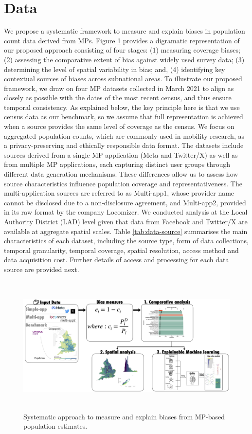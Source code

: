 \documentclass[]{rsos}%
\begin{document}
\section{Data}\label{sec-data}

We propose a systematic framework to measure and explain biases in
population count data derived from MPs. Figure
\ref{fig:debias-approach} provides a digramatic representation of our
proposed approach consisting of four stages: (1) measuring coverage
biases; (2) assessing the comparative extent of bias against widely used
survey data; (3) determining the level of spatial variability in bias;
and, (4) identifying key contextual sources of biases across subnational
areas. To illustrate our proposed framework, we draw on four MP datasets
collected in March 2021 to align as closely as possible with the dates
of the most recent census, and thus ensure temporal consistency. As
explained below, the key principle here is that we use census data as
our benchmark, so we assume that full representation is achieved when a
source provides the same level of coverage as the census. We focus on
aggregated population counts, which are commonly used in mobility
research, as a privacy-preserving and ethically responsible data format.
The datasets include sources derived from a single MP application (Meta
and Twitter/X) as well as from multiple MP applications, each capturing
distinct user groups through different data generation mechanisms. These
differences allow us to assess how source characteristics influence
population coverage and representativeness. The multi-application
sources are referred to as Multi-app1, whose provider name cannot be
disclosed due to a non-disclosure agreement, and Multi-app2, provided in
its raw format by the company Locomizer. We conducted analysis at the
Local Authority District (LAD) level given that data from Facebook and
Twitter/X are available at aggregate spatial scales. Table
\ref{tab:data-source} summarises the main characteristics of each
dataset, including the source type, form of data collections, temporal
granularity, temporal coverage, spatial resolution, access method and
data acquisition cost. Further details of access and processing for each
data source are provided next.

\begin{figure}
\centering
\includegraphics[width=14cm,height=7cm]{figures/debias-approach.png}
\caption{Systematic approach to measure and explain biases from MP-based
population estimates.}\label{fig:debias-approach}
\end{figure}
\end{document}

